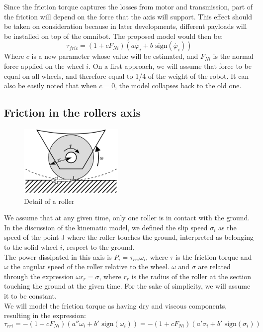 \documentclass[twoside,onecolumn]{article}
\let\oldsubsection\subsection
\renewcommand\subsection{\Needspace{13\baselineskip}\oldsubsection}
\begin{document}
Since the friction torque captures the losses from motor and transmission, part of the friction will depend on the force that the axis will support. This effect should be taken on consideration because in later developments, different payloads will be installed on top of the omnibot. The proposed model would then be:
$$\tau_{fric} = (1 + c F_{Ni})(a \dot{\varphi_i} + b\text{ sign}(\dot{\varphi_i}))$$
Where $c$ is a new parameter whose value will be estimated, and $F_{Ni}$ is the normal force applied on the wheel $i$. On a first approach, we will assume that force to be equal on all wheels, and therefore equal to 1/4 of the weight of the robot. It can also be easily noted that when $c = 0$, the model collapses back to the old one. 


\subsection{Friction in the rollers axis}

\begin{figure}%
	\includegraphics[width=50mm]{images/rodillos1.png}
	\caption{Detail of a roller}
	\label{fig:fig01}
\end{figure}

We assume that at any given time, only one roller is in contact with the ground. In the discussion of the kinematic model, we defined the slip speed $\sigma_i$ as the speed of the point J where the roller touches the ground, interpreted as belonging to the solid wheel $i$, respect to the ground.\\ 
The power dissipated in this axis is $P_i = \tau_{rri} \omega_i$, where $\tau$ is the friction torque and $\omega$ the angular speed of the roller relative to the wheel. $\omega$ and $\sigma$ are related through the expression $\omega r_r = \sigma$, where $r_r$ is the radius of the roller at the section touching the ground at the given time. For the sake of simplicity, we will assume it to be constant.\\
We will model the friction torque as having dry and viscous components, resulting in the expression:
$$\tau_{rri} = -(1 + c F_{Ni})(a'' \omega_i + b'\text{ sign}(\omega_i)) = -(1 + c F_{Ni})(a' \sigma_i + b'\text{ sign}(\sigma_i))$$
\end{document}

